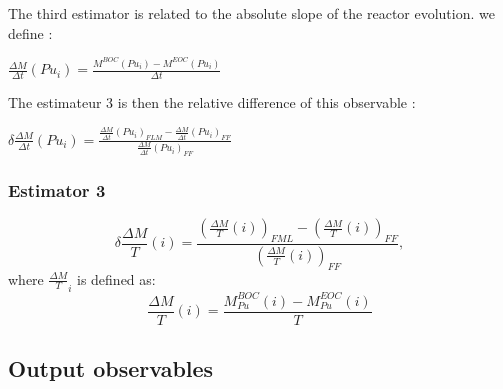 The third estimator is related to the absolute slope of the reactor evolution. we define :

$\frac{\Delta M}{\Delta t}(Pu_i) = \frac{M^{BOC}(Pu_i) - M^{EOC}(Pu_i)}{\Delta t}$

The estimateur 3 is then the relative difference of this observable : 

$\delta \frac{\Delta M}{\Delta t}(Pu_i) = \frac{\frac{\Delta M}{\Delta t}(Pu_i)_{FLM} - \frac{\Delta M}{\Delta t}(Pu_i)_{FF}}{\frac{\Delta M}{\Delta t}(Pu_i)_{FF}}$




\subsubsection{Estimator 3}


\begin{equation}
    \delta{\frac{\Delta M}{T}}(i) =
        \frac{\left(\frac{\Delta M}{T}(i)\right)_{FML}
              - \left(\frac{\Delta M}{T}(i)\right)_{FF}}
             {\left(\frac{\Delta M}{T}(i)\right)_{FF}},
\end{equation}
where $\frac{\Delta M}{T}_{i}$ is defined as:
\begin{equation}
    \frac{\Delta M}{T}(i) = \frac{M_{Pu}^{BOC}(i) -
    M_{Pu}^{EOC}(i)}{T}
\end{equation}

\subsection{Output observables}


